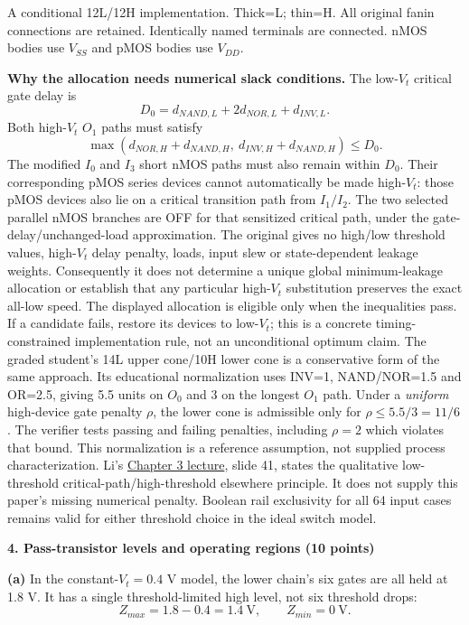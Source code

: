 \documentclass[10pt]{article}
\newcommand{\qheading}[1]{\par\medskip\textbf{#1}\par}
\begin{document}
\small A conditional 12L/12H implementation. Thick=L; thin=H. All original fanin connections are retained. Identically named terminals are connected. nMOS bodies use $V_{SS}$ and pMOS bodies use $V_{DD}$.\normalsize\par
\newpage
\textbf{Why the allocation needs numerical slack conditions.} The low-$V_t$ critical gate delay is
\[D_0=d_{NAND,L}+2d_{NOR,L}+d_{INV,L}.\]
Both high-$V_t$ $O_1$ paths must satisfy
\[\max(d_{NOR,H}+d_{NAND,H},\ d_{INV,H}+d_{NAND,H})\le D_0.\]
The modified $I_0$ and $I_3$ short nMOS paths must also remain within $D_0$. Their corresponding pMOS series devices cannot automatically be made high-$V_t$: those pMOS devices also lie on a critical transition path from $I_1/I_2$. The two selected parallel nMOS branches are OFF for that sensitized critical path, under the gate-delay/unchanged-load approximation.
The original gives no high/low threshold values, high-$V_t$ delay penalty, loads, input slew or state-dependent leakage weights. Consequently it does not determine a unique global minimum-leakage allocation or establish that any particular high-$V_t$ substitution preserves the exact all-low speed. The displayed allocation is eligible only when the inequalities pass. If a candidate fails, restore its devices to low-$V_t$; this is a concrete timing-constrained implementation rule, not an unconditional optimum claim.
The graded student's 14L upper cone/10H lower cone is a conservative form of the same approach. Its educational normalization uses INV=1, NAND/NOR=1.5 and OR=2.5, giving 5.5 units on $O_0$ and 3 on the longest $O_1$ path. Under a \emph{uniform} high-device gate penalty $\rho$, the lower cone is admissible only for $\rho\le5.5/3=11/6$. The verifier tests passing and failing penalties, including $\rho=2$ which violates that bound. This normalization is a reference assumption, not supplied process characterization.
Li's \href{https://www.ee.ncu.edu.tw/jfli/public_html/VLSI/lecture/ch03.pdf}{Chapter 3 lecture}, slide 41, states the qualitative low-threshold critical-path/high-threshold elsewhere principle. It does not supply this paper's missing numerical penalty. Boolean rail exclusivity for all 64 input cases remains valid for either threshold choice in the ideal switch model.
\qheading{4. Pass-transistor levels and operating regions (10 points)}
\textbf{(a)} In the constant-$V_t=0.4$ V model, the lower chain's six gates are all held at 1.8 V. It has a single threshold-limited high level, not six threshold drops:
\[\boxed{Z_{max}=1.8-0.4=1.4\ \mathrm{V},\qquad Z_{min}=0\ \mathrm{V}.}\]
\end{document}
